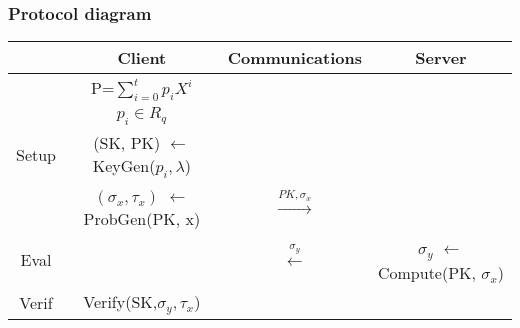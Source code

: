 \subsubsection{Protocol diagram}
\begin{tabular}{|c|c c c|}
  \hline
  & \textbf{Client} & \textbf{Communications} & \textbf{Server} \TBstrut\\
  \hline
  & P=$\sum_{i=0}^{t}p_i X^i$ & & \Tstrut \\
  & $p_i \in R_q$& & \\ 
  Setup & (SK, PK) $\leftarrow $ KeyGen($p_i, \lambda$) & & \\ 
  & $(\sigma_x, \tau_x)$ $\leftarrow $ ProbGen(PK, x) & $\xrightarrow[]{PK, \sigma_x}$ & \Bstrut \\
  \hline
  Eval & & $\xleftarrow[]{\sigma_y}$ & $\sigma_y$ $\leftarrow$ Compute(PK, $\sigma_x$) \TBstrut \\ 
  \hline
  Verif & Verify(SK,$\sigma_y, \tau_x$) & & \TBstrut \\
  \hline
\end{tabular}
